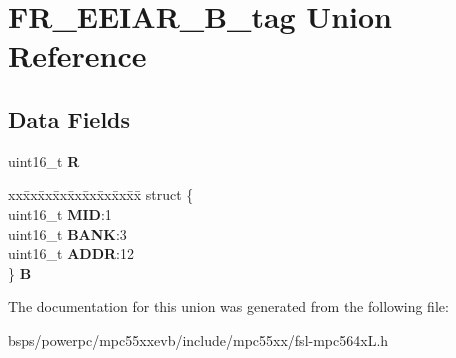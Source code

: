 \hypertarget{unionFR__EEIAR__16B__tag}{}\section{F\+R\+\_\+\+E\+E\+I\+A\+R\+\_\+B\+\_\+tag Union Reference}
\label{unionFR__EEIAR__16B__tag}
\subsection*{Data Fields}
\begin{DoxyCompactItemize}
\item 
\mbox{\label{unionFR__EEIAR__16B__tag_aecf6381cd3a8eacedd9c3fcd8c98d93e}} 
uint16\+\_\+t {\bfseries R}
\item 
\mbox{\label{unionFR__EEIAR__16B__tag_a52dfcb0c185a18c39b47175de79d8daf}} 
\begin{tabbing}
xx\=xx\=xx\=xx\=xx\=xx\=xx\=xx\=xx\=\kill
struct \{\\
\>uint16\_t {\bfseries MID}:1\\
\>uint16\_t {\bfseries BANK}:3\\
\>uint16\_t {\bfseries ADDR}:12\\
\} {\bfseries B}\\

\end{tabbing}\end{DoxyCompactItemize}


The documentation for this union was generated from the following file\+:\begin{DoxyCompactItemize}
\item 
bsps/powerpc/mpc55xxevb/include/mpc55xx/fsl-\/mpc564x\+L.\+h\end{DoxyCompactItemize}
